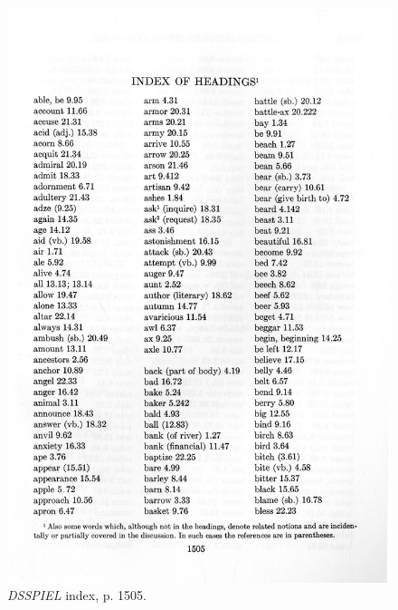 \begin{figure}[htbp]
  \centering
    \includegraphics[width=\linewidth]{Stolk_thes-content/fig/thes/DSSPIEL-p1505.jpg}
    \caption{\textit{DSSPIEL} index, p. 1505.}
  \label{fig:1.A:DSSPIEL:index}
\end{figure}


